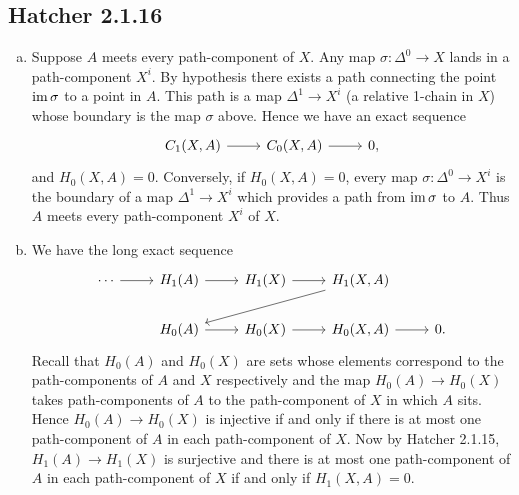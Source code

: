 \documentclass{../mathnotes}
\begin{document}
\subsection*{Hatcher 2.1.16}
\begin{enumerate}[(a)]
    \item Suppose $A$ meets every path-component of $X$. Any map $\sigma:\Delta^0\to X$ lands in a path-component
        $X^i$. By hypothesis there exists a path connecting the point $\operatorname{im} \sigma$ to a point in $A$. This
        path is a map $\Delta^1\to X^i$ (a relative 1-chain in $X$) whose boundary is the map $\sigma$ above.
        Hence we have an exact sequence
        \begin{equation*}
            \begin{tikzcd}
                C_1(X,A)\ar{r} & C_0(X,A)\ar{r} & 0,
            \end{tikzcd}
        \end{equation*}
        and $H_0(X,A)=0$. Conversely, if $H_0(X,A)=0$, every map $\sigma:\Delta^0\to X^i$ is the boundary of
        a map $\Delta^1\to X^i$ which provides a path from $\operatorname{im}\sigma$ to $A$. Thus $A$ meets every path-component
        $X^i$ of $X$.
    \item We have the long exact sequence
        \begin{equation*}
            \begin{tikzcd}
                \cdots\ar{r} & H_1(A)\ar{r} & H_1(X)\ar{r} & H_1(X,A)\ar{dll}\\
                & H_0(A)\ar{r} & H_0(X)\ar{r} & H_0(X,A)\ar{r} & 0.
            \end{tikzcd}
        \end{equation*}
        Recall that $H_0(A)$ and $H_0(X)$ are sets whose elements correspond to the path-components
        of $A$ and $X$ respectively and the map $H_0(A)\to H_0(X)$ takes path-components of $A$ to
        the path-component of $X$ in which $A$ sits. Hence $H_0(A)\to H_0(X)$ is injective if and only if
        there is at most one path-component of $A$ in each path-component of $X$. Now by Hatcher 2.1.15,
        $H_1(A)\to H_1(X)$ is surjective and there is at most one path-component of $A$ in each path-component
        of $X$ if and only if $H_1(X,A)=0$.
\end{enumerate}
\end{document}
